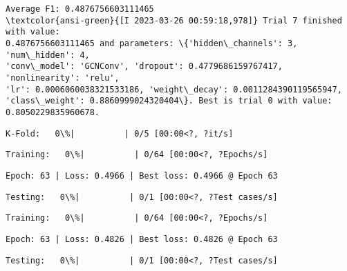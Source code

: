 \documentclass[11pt]{article}
\begin{document}
    
    \begin{Verbatim}[commandchars=\\\{\}]
Average F1: 0.4876756603111465
\textcolor{ansi-green}{[I 2023-03-26 00:59:18,978]} Trial 7 finished with value:
0.4876756603111465 and parameters: \{'hidden\_channels': 3, 'num\_hidden': 4,
'conv\_model': 'GCNConv', 'dropout': 0.4779686159767417, 'nonlinearity': 'relu',
'lr': 0.0006060038321533186, 'weight\_decay': 0.0011284390119565947,
'class\_weight': 0.8860999024320404\}. Best is trial 0 with value:
0.8050229835960678.
    \end{Verbatim}

    
    \begin{Verbatim}[commandchars=\\\{\}]
K-Fold:   0\%|          | 0/5 [00:00<?, ?it/s]
    \end{Verbatim}

    
    
    \begin{Verbatim}[commandchars=\\\{\}]
Training:   0\%|          | 0/64 [00:00<?, ?Epochs/s]
    \end{Verbatim}

    
    \begin{Verbatim}[commandchars=\\\{\}]
Epoch: 63 | Loss: 0.4966 | Best loss: 0.4966 @ Epoch 63
    \end{Verbatim}

    
    \begin{Verbatim}[commandchars=\\\{\}]
Testing:   0\%|          | 0/1 [00:00<?, ?Test cases/s]
    \end{Verbatim}

    
    
    \begin{Verbatim}[commandchars=\\\{\}]
Training:   0\%|          | 0/64 [00:00<?, ?Epochs/s]
    \end{Verbatim}

    
    \begin{Verbatim}[commandchars=\\\{\}]
Epoch: 63 | Loss: 0.4826 | Best loss: 0.4826 @ Epoch 63
    \end{Verbatim}

    
    \begin{Verbatim}[commandchars=\\\{\}]
Testing:   0\%|          | 0/1 [00:00<?, ?Test cases/s]
    \end{Verbatim}
\end{document}
